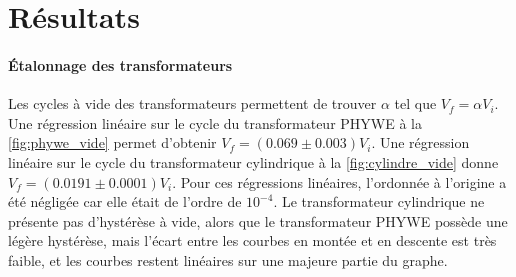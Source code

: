 \section{Résultats}

\paragraph{Étalonnage des transformateurs}
Les cycles à vide des transformateurs permettent de trouver \(\alpha\) tel que \(V_f = \alpha V_i\). Une régression linéaire sur le cycle du transformateur PHYWE à la \autoref{fig:phywe_vide} permet d'obtenir \mbox{\(V_f = (0.069 \pm 0.003) V_i\)}. Une régression linéaire sur le cycle du transformateur cylindrique à la \autoref{fig:cylindre_vide} donne \mbox{\(V_f = (0.0191 \pm 0.0001) V_i\)}. Pour ces régressions linéaires, l'ordonnée à l'origine a été négligée car elle était de l'ordre de \(10^{-4}\). Le transformateur cylindrique ne présente pas d'hystérèse à vide, alors que le transformateur PHYWE possède une légère hystérèse, mais l'écart entre les courbes en montée et en descente est très faible, et les courbes restent linéaires sur une majeure partie du graphe.

